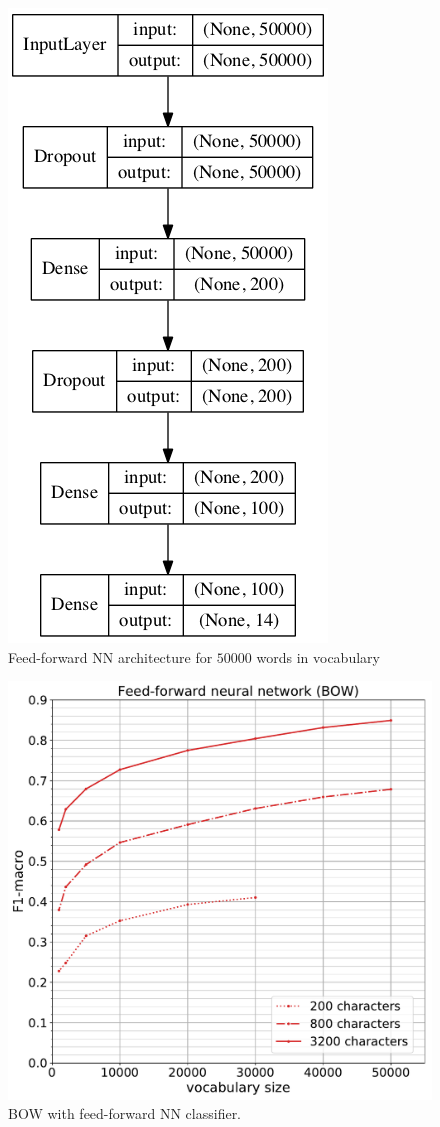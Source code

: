 \begin{figure}[h]
	\centering
	\includegraphics[height=0.3\textheight]{img/bow_nn}
	\caption{Feed-forward NN architecture for $50000$ words in vocabulary}
	\label{fig:bow_nn_architecture}
\end{figure}

\begin{figure}[h]
	\centering
	\includegraphics[height=0.3\textheight]{img/05_bow_nn}
	\caption{BOW with feed-forward NN classifier.}
	\label{fig:bow_nn}
\end{figure}


